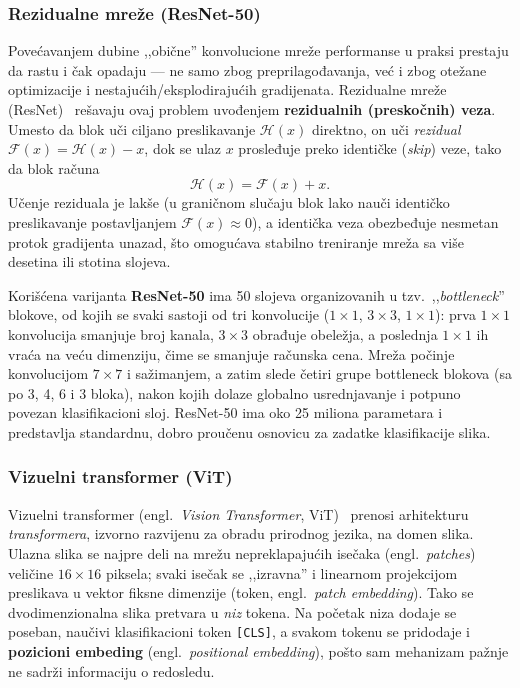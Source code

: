 \documentclass[12pt,a4paper]{article}
\begin{document}
\subsubsection{Rezidualne mreže (ResNet-50)}
\label{sec:resnet}

Povećavanjem dubine ,,obične'' konvolucione mreže performanse u praksi prestaju da rastu i
čak opadaju --- ne samo zbog preprilagođavanja, već i zbog otežane optimizacije i
nestajućih/eksplodirajućih gradijenata. Rezidualne mreže (ResNet)~\cite{he2016deep}
rešavaju ovaj problem uvođenjem \textbf{rezidualnih (preskočnih) veza}. Umesto da blok uči
ciljano preslikavanje $\mathcal{H}(x)$ direktno, on uči \textit{rezidual}
$\mathcal{F}(x)=\mathcal{H}(x)-x$, dok se ulaz $x$ prosleđuje preko identičke (\textit{skip})
veze, tako da blok računa
\begin{equation}
\mathcal{H}(x)=\mathcal{F}(x)+x.
\label{eq:rezidual}
\end{equation}
Učenje reziduala je lakše (u graničnom slučaju blok lako nauči identičko preslikavanje
postavljanjem $\mathcal{F}(x)\!\approx\!0$), a identička veza obezbeđuje nesmetan protok
gradijenta unazad, što omogućava stabilno treniranje mreža sa više desetina ili stotina
slojeva.

Korišćena varijanta \textbf{ResNet-50} ima 50 slojeva organizovanih u tzv.\
,,\textit{bottleneck}'' blokove, od kojih se svaki sastoji od tri konvolucije
($1\times1$, $3\times3$, $1\times1$): prva $1\times1$ konvolucija smanjuje broj kanala,
$3\times3$ obrađuje obeležja, a poslednja $1\times1$ ih vraća na veću dimenziju, čime se
smanjuje računska cena. Mreža počinje konvolucijom $7\times7$ i sažimanjem, a zatim slede
četiri grupe bottleneck blokova (sa po 3, 4, 6 i 3 bloka), nakon kojih dolaze globalno
usrednjavanje i potpuno povezan klasifikacioni sloj. ResNet-50 ima oko 25 miliona
parametara i predstavlja standardnu, dobro proučenu osnovicu za zadatke klasifikacije
slika.

\subsubsection{Vizuelni transformer (ViT)}
\label{sec:vit}

Vizuelni transformer (engl.\ \textit{Vision Transformer}, ViT)~\cite{dosovitskiy2021vit}
prenosi arhitekturu \textit{transformera}, izvorno razvijenu za obradu prirodnog jezika,
na domen slika. Ulazna slika se najpre deli na mrežu nepreklapajućih isečaka (engl.\
\textit{patches}) veličine $16\times16$ piksela; svaki isečak se ,,izravna'' i linearnom
projekcijom preslikava u vektor fiksne dimenzije (token, engl.\ \textit{patch embedding}).
Tako se dvodimenzionalna slika pretvara u \textit{niz} tokena. Na početak niza dodaje se
poseban, naučivi klasifikacioni token \texttt{[CLS]}, a svakom tokenu se pridodaje i
\textbf{pozicioni embeding} (engl.\ \textit{positional embedding}), pošto sam mehanizam
pažnje ne sadrži informaciju o redosledu.
\end{document}
